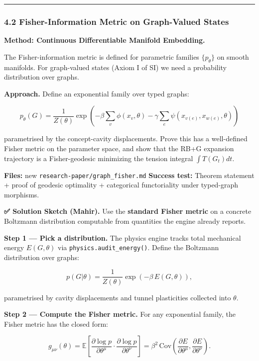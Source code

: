 \documentclass[
  11pt,
  a4paper,
]{article}
\begin{document}
\begin{center}\rule{0.5\linewidth}{0.5pt}\end{center}

\subsubsection{4.2 Fisher-Information Metric on Graph-Valued
States}\label{fisher-information-metric-on-graph-valued-states}

\textbf{Method: Continuous Differentiable Manifold Embedding.}

The Fisher-information metric is defined for parametric families
\(\{p_\theta\}\) on smooth manifolds. For graph-valued states (Axiom I
of SI) we need a probability distribution over graphs.

\textbf{Approach.} Define an exponential family over typed graphs:

\[
p_\theta(G) = \frac{1}{Z(\theta)} \exp\left(-\beta \sum_v \phi(x_v, \theta) - \gamma \sum_e \psi(x_{v(e)}, x_{w(e)}, \theta)\right)
\]

parametrised by the concept-cavity displacements. Prove this has a
well-defined Fisher metric on the parameter space, and show that the
RB+G expansion trajectory is a Fisher-geodesic minimizing the tension
integral \(\int T(G_t) dt\).

\textbf{Files:} new \texttt{research-paper/graph\_fisher.md}
\textbf{Success test:} Theorem statement + proof of geodesic optimality
+ categorical functoriality under typed-graph morphisms.

\textbf{✅ Solution Sketch (Mahir).} Use the \textbf{standard Fisher
metric} on a concrete Boltzmann distribution computable from quantities
the engine already reports.

\textbf{Step 1 --- Pick a distribution.} The physics engine tracks total
mechanical energy \(E(G, \theta)\) via \texttt{physics.audit\_energy()}.
Define the Boltzmann distribution over graphs:

\[
p(G | \theta) = \frac{1}{Z(\theta)} \exp\left(-\beta \, E(G, \theta)\right),
\]

parametrised by cavity displacements and tunnel plasticities collected
into \(\theta\).

\textbf{Step 2 --- Compute the Fisher metric.} For any exponential
family, the Fisher metric has the closed form:

\[
g_{\mu\nu}(\theta) = \mathbb{E}\!\left[\frac{\partial \log p}{\partial \theta^\mu} \cdot \frac{\partial \log p}{\partial \theta^\nu}\right] = \beta^2 \, \mathrm{Cov}\!\left(\frac{\partial E}{\partial \theta^\mu}, \frac{\partial E}{\partial \theta^\nu}\right).
\]
\end{document}
